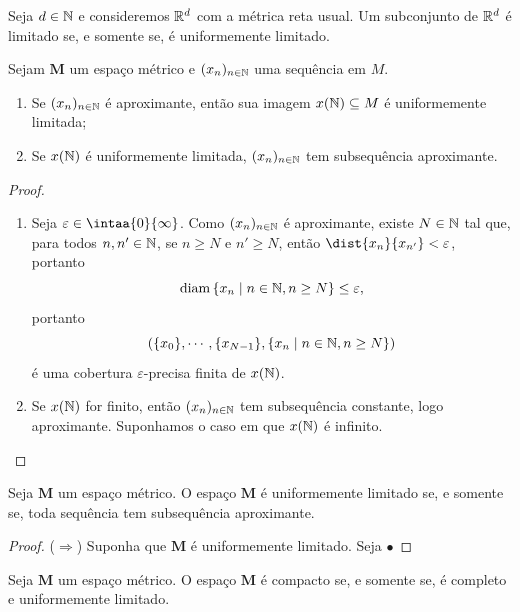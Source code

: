 \begin{exerc}
Seja $d \in \mathbb{N}$ e consideremos $\mathbb{R}^d$ com a métrica reta usual. Um subconjunto de $\mathbb{R}^d$ é limitado se, e somente se, é uniformemente limitado.
\end{exerc}

\begin{lema}
Sejam $\bm M$ um espaço métrico e $(x_n)_{n \in \mathbb{N}}$ uma sequência em $M$.
	\begin{enumerate}
	\item Se $(x_n)_{n \in \mathbb{N}}$ é aproximante, então sua imagem $x(\mathbb{N}) \subseteq M$ é uniformemente limitada;
	\item Se $x(\mathbb{N})$ é uniformemente limitada, $(x_n)_{n \in \mathbb{N}}$ tem subsequência aproximante.
	\end{enumerate}
\end{lema}
\begin{proof}
	\begin{enumerate}
	\item Seja $\varepsilon \in \intaa{0}{\infty}$. Como $(x_n)_{n \in \mathbb{N}}$ é aproximante, existe $N \in \mathbb{N}$ tal que, para todos $n,n' \in \mathbb{N}$, se $n \geq N$ e $n' \geq N$, então $\dist{x_n}{x_{n'}} < \varepsilon$, portanto
		\begin{equation*}
		\operatorname{diam} \left\{x_n \;\middle\vert\; n \in \mathbb{N}, n \geq N \right\} \leq \varepsilon,
		\end{equation*}
portanto
		\begin{equation*}
		(\{x_0\},\cdots,\{x_{N-1}\}, \left\{x_n \;\middle\vert\; n \in \mathbb{N}, n \geq N \right\})
		\end{equation*}
é uma cobertura $\varepsilon$-precisa finita de $x(\mathbb{N})$.

	\item Se $x(\mathbb{N})$ for finito, então $(x_n)_{n \in \mathbb{N}}$ tem subsequência constante, logo aproximante. Suponhamos o caso em que $x(\mathbb{N})$ é infinito.

	\end{enumerate}
\end{proof}


\begin{prop}
Seja $\bm M$ um espaço métrico. O espaço $\bm M$ é uniformemente limitado se, e somente se, toda sequência tem subsequência aproximante.
\end{prop}
\begin{proof}
($\Rightarrow$) Suponha que $\bm M$ é uniformemente limitado. Seja $•$
\end{proof}

\begin{prop}
Seja $\bm M$ um espaço métrico. O espaço $\bm M$ é compacto se, e somente se, é completo e uniformemente limitado. 
\end{prop}






